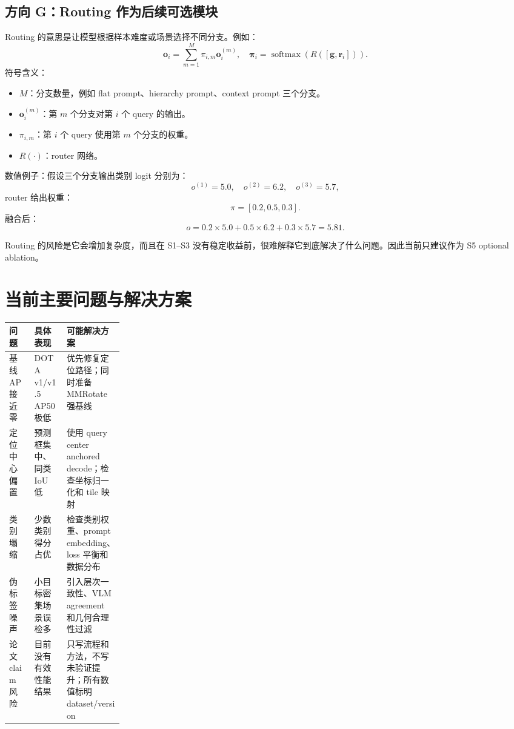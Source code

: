 \documentclass[11pt,a4paper]{ctexart}
\begin{document}
\subsection{方向 G：Routing 作为后续可选模块}

Routing 的意思是让模型根据样本难度或场景选择不同分支。例如：
\[
\bm o_i=\sum_{m=1}^{M}\pi_{i,m}\bm o_i^{(m)},
\quad
\bm \pi_i=\operatorname{softmax}(R([\bm g,\bm r_i])).
\]
符号含义：
\begin{itemize}
  \item $M$：分支数量，例如 flat prompt、hierarchy prompt、context prompt 三个分支。
  \item $\bm o_i^{(m)}$：第 $m$ 个分支对第 $i$ 个 query 的输出。
  \item $\pi_{i,m}$：第 $i$ 个 query 使用第 $m$ 个分支的权重。
  \item $R(\cdot)$：router 网络。
\end{itemize}

数值例子：假设三个分支输出类别 logit 分别为：
\[
o^{(1)}=5.0,\quad o^{(2)}=6.2,\quad o^{(3)}=5.7,
\]
router 给出权重：
\[
\pi=[0.2,0.5,0.3].
\]
融合后：
\[
o=0.2\times5.0+0.5\times6.2+0.3\times5.7=5.81.
\]

Routing 的风险是它会增加复杂度，而且在 S1--S3 没有稳定收益前，很难解释它到底解决了什么问题。因此当前只建议作为 S5 optional ablation。

\section{当前主要问题与解决方案}

\noindent\begin{tabularx}{\linewidth}{p{0.22\linewidth}XX}
\toprule
问题 & 具体表现 & 可能解决方案 \\
\midrule
基线 AP 接近零 & DOTA v1/v1.5 AP50 极低 & 优先修复定位路径；同时准备 MMRotate 强基线 \\
定位中心偏置 & 预测框集中、同类 IoU 低 & 使用 query center anchored decode；检查坐标归一化和 tile 映射 \\
类别塌缩 & 少数类别得分占优 & 检查类别权重、prompt embedding、loss 平衡和数据分布 \\
伪标签噪声 & 小目标密集场景误检多 & 引入层次一致性、VLM agreement 和几何合理性过滤 \\
论文 claim 风险 & 目前没有有效性能结果 & 只写流程和方法，不写未验证提升；所有数值标明 dataset/version \\
\bottomrule
\end{tabularx}
\end{document}
